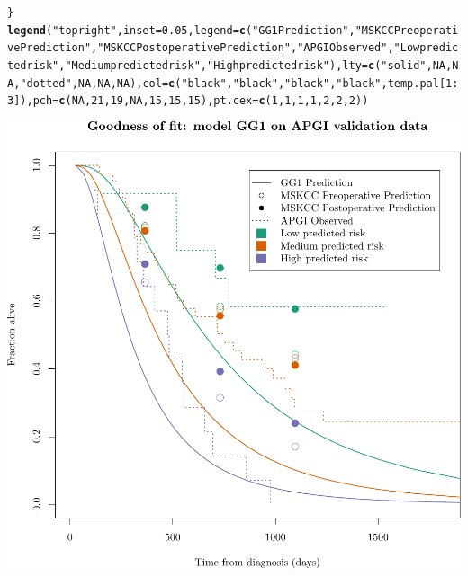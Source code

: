 \documentclass{article}\usepackage[]{graphicx}\usepackage[]{color}
\makeatletter
\def\maxwidth{ %
  \ifdim\Gin@nat@width>\linewidth
    \linewidth
  \else
    \Gin@nat@width
  \fi
}
\newcommand{\hlnum}[1]{\textcolor[rgb]{0.686,0.059,0.569}{#1}}%
\newcommand{\hlstr}[1]{\textcolor[rgb]{0.192,0.494,0.8}{#1}}%
\newcommand{\hlopt}[1]{\textcolor[rgb]{0,0,0}{#1}}%
\newcommand{\hlstd}[1]{\textcolor[rgb]{0.345,0.345,0.345}{#1}}%
\newcommand{\hlkwc}[1]{\textcolor[rgb]{0.333,0.667,0.333}{#1}}%
\newcommand{\hlkwd}[1]{\textcolor[rgb]{0.737,0.353,0.396}{\textbf{#1}}}%
\newenvironment{kframe}{%
 \def\at@end@of@kframe{}%
 \ifinner\ifhmode%
  \def\at@end@of@kframe{\end{minipage}}%
  \begin{minipage}{\columnwidth}%
 \fi\fi%
 \def\FrameCommand##1{\hskip\@totalleftmargin \hskip-\fboxsep
 \colorbox{shadecolor}{##1}\hskip-\fboxsep
     \hskip-\linewidth \hskip-\@totalleftmargin \hskip\columnwidth}%
 \MakeFramed {\advance\hsize-\width
   \@totalleftmargin\z@ \linewidth\hsize
   \@setminipage}}%
 {\par\unskip\endMakeFramed%
 \at@end@of@kframe}
\newenvironment{knitrout}{}{} %
\makeatother
\begin{document}
\begin{knitrout}
\begin{kframe}
\begin{alltt}
\hlstd{\}}
\hlkwd{legend}\hlstd{(}\hlstr{"topright"}\hlstd{,} \hlkwc{inset} \hlstd{=} \hlnum{0.05}\hlstd{,} \hlkwc{legend} \hlstd{=} \hlkwd{c}\hlstd{(}\hlstr{"GG1 Prediction"}\hlstd{,} \hlstr{"MSKCC Preoperative Prediction"}\hlstd{,} \hlstr{"MSKCC Postoperative Prediction"}\hlstd{,} \hlstr{"APGI Observed"}\hlstd{,} \hlstr{"Low predicted risk"}\hlstd{,} \hlstr{"Medium predicted risk"}\hlstd{,} \hlstr{"High predicted risk"}\hlstd{),} \hlkwc{lty} \hlstd{=} \hlkwd{c}\hlstd{(}\hlstr{"solid"}\hlstd{,} \hlnum{NA}\hlstd{,} \hlnum{NA}\hlstd{,} \hlstr{"dotted"}\hlstd{,} \hlnum{NA}\hlstd{,} \hlnum{NA}\hlstd{,} \hlnum{NA}\hlstd{),} \hlkwc{col} \hlstd{=} \hlkwd{c}\hlstd{(}\hlstr{"black"}\hlstd{,} \hlstr{"black"}\hlstd{,} \hlstr{"black"}\hlstd{,} \hlstr{"black"}\hlstd{, temp.pal[}\hlnum{1}\hlopt{:}\hlnum{3}\hlstd{]),} \hlkwc{pch} \hlstd{=} \hlkwd{c}\hlstd{(}\hlnum{NA}\hlstd{,} \hlnum{21}\hlstd{,} \hlnum{19}\hlstd{,} \hlnum{NA}\hlstd{,} \hlnum{15}\hlstd{,} \hlnum{15}\hlstd{,} \hlnum{15}\hlstd{),} \hlkwc{pt.cex} \hlstd{=} \hlkwd{c}\hlstd{(}\hlnum{1}\hlstd{,} \hlnum{1}\hlstd{,} \hlnum{1}\hlstd{,} \hlnum{1}\hlstd{,} \hlnum{2}\hlstd{,} \hlnum{2}\hlstd{,} \hlnum{2}\hlstd{))}
\end{alltt}
\end{kframe}

{\centering \includegraphics[width=\maxwidth]{figure/07-altman-4-apgi-1} 

}
\end{knitrout}
\end{document}
